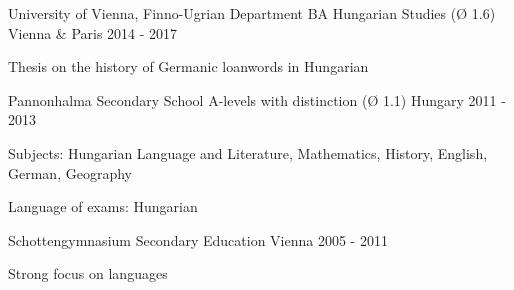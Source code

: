 \begin{cventries}
  \cventry
    {University of Vienna, Finno-Ugrian Department} %
    {BA Hungarian Studies (Ø 1.6)} %
    {Vienna \& Paris} %
    {2014 - 2017} %
    {
      \begin{cvitems} %
        \item {Thesis on the history of Germanic loanwords in Hungarian}
      \end{cvitems}
    }
        
  \cventry
    {Pannonhalma Secondary School} %
    {A-levels with distinction (Ø 1.1)} %
    {Hungary} %
    {2011 - 2013} %
    {
      \begin{cvitems} %
        \item {Subjects: Hungarian Language and Literature, Mathematics, History, English, German, Geography}
        \item{Language of exams: Hungarian}
      \end{cvitems}
    }

  \cventry    
    {Schottengymnasium} %
    {Secondary Education} %
    {Vienna} %
    {2005 - 2011} %
    {
      \begin{cvitems} %
        \item {Strong focus on languages}
      \end{cvitems}
    }
\end{cventries}
